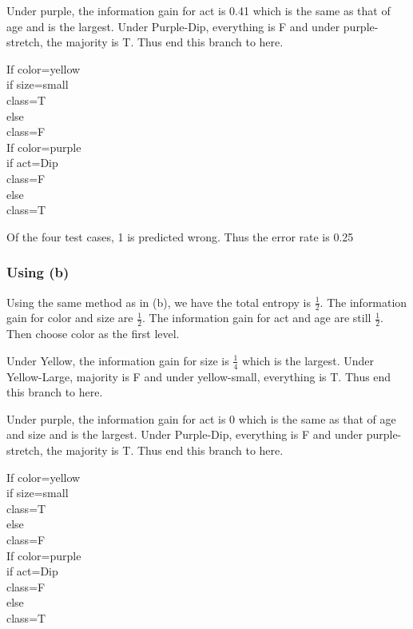 \noindent Under purple, the information gain for act is 0.41 which is the same as that of age and is the largest. Under Purple-Dip, everything is F and under purple-stretch, the majority is T.  Thus end this branch to here. 

\noindent If color=yellow
\\ \indent if size=small
\\ \indent \indent class=T
\\ \indent else 
\\ \indent \indent class=F
\\ \noindent If color=purple
\\ \indent if act=Dip
\\ \indent \indent class=F
\\ \indent else 
\\ \indent \indent class=T

\noindent Of the four test cases, 1 is predicted wrong. Thus the error rate is 0.25
\subsubsection{Using (b)}
\noindent Using the same method as in (b), we have the total entropy is $\frac{1}{2}$. The information gain for color and size are $\frac{1}{2}$. The information gain for act and age are still $\frac{1}{2}$. Then choose color as the first level.

\noindent Under Yellow, the information gain for size is $\frac{1}{4}$ which is the largest. Under Yellow-Large, majority is F and under yellow-small, everything is T. Thus end this branch to here. 

\noindent Under purple, the information gain for act is 0 which is the same as that of age and size and is the largest. Under Purple-Dip, everything is F and under purple-stretch, the majority is T.  Thus end this branch to here. 

\noindent If color=yellow
\\ \indent if size=small
\\ \indent \indent class=T
\\ \indent else 
\\ \indent \indent class=F
\\ \noindent If color=purple
\\ \indent if act=Dip
\\ \indent \indent class=F
\\ \indent else 
\\ \indent \indent class=T

